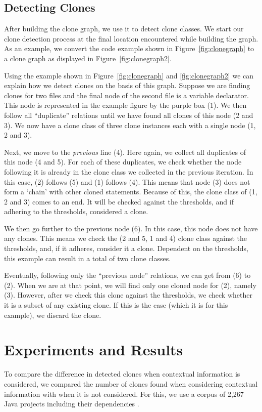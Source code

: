 \documentclass[conference]{IEEEtran}
\begin{document}
\subsection{Detecting Clones} \label{sec:detectingclones}
After building the clone graph, we use it to detect clone classes. We start our clone detection process at the final location encountered while building the graph. As an example, we convert the code example shown in Figure~\ref{fig:clonegraph} to a clone graph as displayed in Figure~\ref{fig:clonegraph2}.

Using the example shown in Figure~\ref{fig:clonegraph} and \ref{fig:clonegraph2} we can explain how we detect clones on the basis of this graph. Suppose we are finding clones for two files and the final node of the second file is a variable declarator. This node is represented in the example figure by the purple box (1). We then follow all ``duplicate'' relations until we have found all clones of this node (2 and 3). We now have a clone class of three clone instances each with a single node (1, 2 and 3).

Next, we move to the \textit{previous} line (4). Here again, we collect all duplicates of this node (4 and 5). For each of these duplicates, we check whether the node following it is already in the clone class we collected in the previous iteration. In this case, (2) follows (5) and (1) follows (4). This means that node (3) does not form a `chain' with other cloned statements. Because of this, the clone class of (1, 2 and 3) comes to an end. It will be checked against the thresholds, and if adhering to the thresholds, considered a clone.

We then go further to the previous node (6). In this case, this node does not have any clones. This means we check the (2 and 5, 1 and 4) clone class against the thresholds, and, if it adheres, consider it a clone. Dependent on the thresholds, this example can result in a total of two clone classes.

Eventually, following only the ``previous node'' relations, we can get from (6) to (2). When we are at that point, we will find only one cloned node for (2), namely (3). However, after we check this clone against the thresholds, we check whether it is a subset of any existing clone. If this is the case (which it is for this example), we discard the clone.

\section{Experiments and Results}
To compare the difference in detected clones when contextual information is considered, we compared the number of clones found when considering contextual information with when it is not considered. For this, we use a corpus of 2,267 Java projects including their dependencies \cite{baars2019towards}. 
\end{document}
